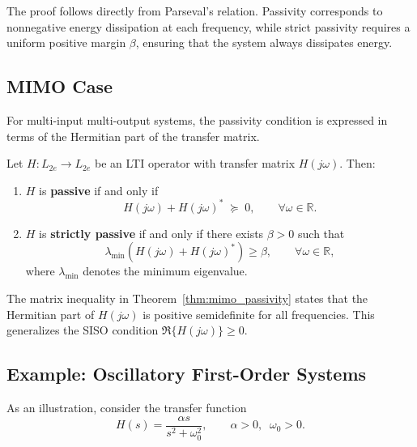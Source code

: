 \begin{remark}
The proof follows directly from Parseval’s relation. Passivity corresponds to 
nonnegative energy dissipation at each frequency, while strict passivity requires a 
uniform positive margin $\beta$, ensuring that the system always dissipates energy. 
\end{remark}

\subsection{MIMO Case}

For multi-input multi-output systems, the passivity condition is expressed in terms 
of the Hermitian part of the transfer matrix.  

\begin{theorem}\label{thm:mimo_passivity}
Let $H : L_{2e} \to L_{2e}$ be an LTI operator with transfer matrix $H(j\omega)$. Then:
\begin{enumerate}
    \item $H$ is \textbf{passive} if and only if
    \begin{equation}
    H(j\omega) + H(j\omega)^* \;\succeq\; 0, 
    \qquad \forall \omega \in \mathbb{R}.
    \end{equation}
    \item $H$ is \textbf{strictly passive} if and only if there exists $\beta > 0$ such that
    \begin{equation}
    \lambda_{\min}\!\left( H(j\omega) + H(j\omega)^* \right) \ge \beta,
    \qquad \forall \omega \in \mathbb{R},
    \end{equation}
    where $\lambda_{\min}$ denotes the minimum eigenvalue.
\end{enumerate}
\end{theorem}

\begin{remark}
The matrix inequality in Theorem~\ref{thm:mimo_passivity} states that the Hermitian part 
of $H(j\omega)$ is positive semidefinite for all frequencies. This generalizes the SISO 
condition $\Re\{H(j\omega)\} \ge 0$.  
\end{remark}

\subsection{Example: Oscillatory First-Order Systems}

As an illustration, consider the transfer function
\begin{equation}
H(s) = \frac{\alpha s}{s^2 + \omega_0^2},
\qquad \alpha > 0, \;\; \omega_0 > 0.
\end{equation}

